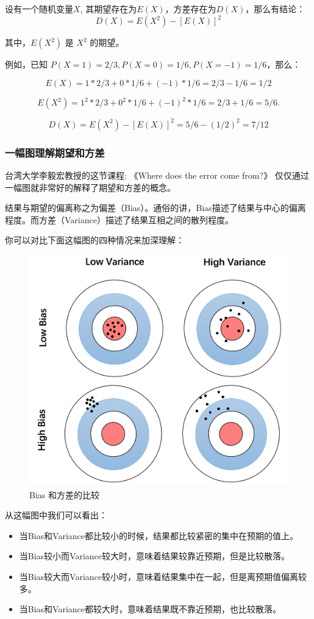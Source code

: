 \documentclass[12pt]{article}
\begin{document}
设有一个随机变量$X$, 其期望存在为$E(X)$，方差存在为$D(X)$，那么有结论：
$$
D(X) = E(X^2) - [E(X)]^2
$$

其中，$E(X^2)$ 是 $X^2$ 的期望。

例如，已知 $P(X=1)= 2/3, P(X=0) = 1/6, P(X=-1) = 1/6$，那么：

$$
E(X) = 1 * 2/3 + 0 * 1/6 +(-1) * 1/6 = 2/3 - 1/6 = 1/2
$$

$$
E(X^2) = 1^2 * 2/3 + 0^2 * 1/6 + (-1)^2 * 1/6 = 2/3 + 1/6 = 5/6.
$$

$$
D(X) = E(X^2) - [E(X)]^2 = 5/6 - (1/2)^2 = 7/12
$$


\subsubsection{一幅图理解期望和方差}
台湾大学李毅宏教授的这节课程: 《Where does the error come from?》 仅仅通过一幅图就非常好的解释了期望和方差的概念。

结果与期望的偏离称之为偏差（Bias）。通俗的讲，Bias描述了结果与中心的偏离程度。而方差（Variance）描述了结果互相之间的散列程度。

你可以对比下面这幅图的四种情况来加深理解：
\begin{figure}[ht]
  \centering
  \includegraphics[width=.8\textwidth]{fig/bias_variance.png} %
  \caption{Bias 和方差的比较} %
\end{figure}

从这幅图中我们可以看出：
\begin{itemize}
    \item 当Bias和Variance都比较小的时候，结果都比较紧密的集中在预期的值上。
    \item 当Bias较小而Variance较大时，意味着结果较靠近预期，但是比较散落。
    \item 当Bias较大而Variance较小时，意味着结果集中在一起，但是离预期值偏离较多。
    \item 当Bias和Variance都较大时，意味着结果既不靠近预期，也比较散落。
\end{itemize}
\end{document}
